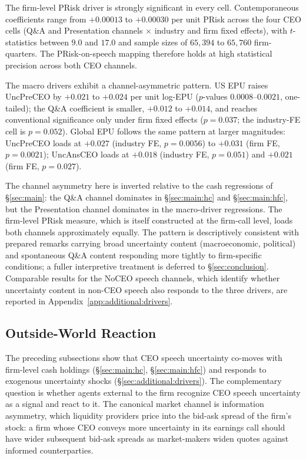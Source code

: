 The firm-level PRisk driver is strongly significant in every cell. Contemporaneous coefficients range from $+0.00013$ to $+0.00030$ per unit PRisk across the four CEO cells (Q\&A and Presentation channels $\times$ industry and firm fixed effects), with $t$-statistics between $9.0$ and $17.0$ and sample sizes of $65{,}394$ to $65{,}760$ firm-quarters. The PRisk-on-speech mapping therefore holds at high statistical precision across both CEO channels.

The macro drivers exhibit a channel-asymmetric pattern. US EPU raises UncPreCEO by $+0.021$ to $+0.024$ per unit log-EPU ($p$-values $0.0008$--$0.0021$, one-tailed); the Q\&A coefficient is smaller, $+0.012$ to $+0.014$, and reaches conventional significance only under firm fixed effects ($p=0.037$; the industry-FE cell is $p=0.052$). Global EPU follows the same pattern at larger magnitudes: UncPreCEO loads at $+0.027$ (industry FE, $p=0.0056$) to $+0.031$ (firm FE, $p=0.0021$); UncAnsCEO loads at $+0.018$ (industry FE, $p=0.051$) and $+0.021$ (firm FE, $p=0.027$).

The channel asymmetry here is inverted relative to the cash regressions of \S\ref{sec:main}: the Q\&A channel dominates in \S\ref{sec:main:hc} and \S\ref{sec:main:hfc}, but the Presentation channel dominates in the macro-driver regressions. The firm-level PRisk measure, which is itself constructed at the firm-call level, loads both channels approximately equally. The pattern is descriptively consistent with prepared remarks carrying broad uncertainty content (macroeconomic, political) and spontaneous Q\&A content responding more tightly to firm-specific conditions; a fuller interpretive treatment is deferred to \S\ref{sec:conclusion}. Comparable results for the NoCEO speech channels, which identify whether uncertainty content in non-CEO speech also responds to the three drivers, are reported in Appendix~\ref{app:additional:drivers}.

\subsection{Outside-World Reaction}
\label{sec:additional:reaction}

The preceding subsections show that CEO speech uncertainty co-moves with firm-level cash holdings (\S\ref{sec:main:hc}, \S\ref{sec:main:hfc}) and responds to exogenous uncertainty shocks (\S\ref{sec:additional:drivers}). The complementary question is whether agents external to the firm recognize CEO speech uncertainty as a signal and react to it. The canonical market channel is information asymmetry, which liquidity providers price into the bid-ask spread of the firm's stock: a firm whose CEO conveys more uncertainty in its earnings call should have wider subsequent bid-ask spreads as market-makers widen quotes against informed counterparties.

